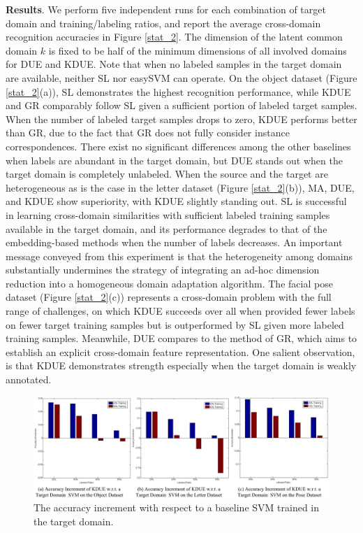 \documentclass[10pt,twocolumn,letterpaper]{article}
\begin{document}
\noindent\textbf{Results}. We perform five independent runs for each combination of target domain and training/labeling ratios, and report the average cross-domain recognition accuracies in Figure \ref{stat_2}. The dimension of the latent common domain $k$ is fixed to be half of the minimum dimensions of all involved domains for DUE and KDUE. Note that when no labeled samples in the target domain are available, neither SL nor easySVM can operate. On the object dataset (Figure \ref{stat_2}(a)), SL demonstrates the highest recognition performance, while KDUE and GR comparably follow SL given a sufficient portion of labeled target samples. When the number of labeled target samples drops to zero, KDUE performs better than GR, due to the fact that GR does not fully consider instance correspondences. There exist no significant differences among the other baselines when labels are abundant in the target domain, but DUE stands out when the target domain is completely unlabeled. When the source and the target are heterogeneous as is the case in the letter dataset (Figure \ref{stat_2}(b)), MA, DUE, and KDUE show superiority, with KDUE slightly standing out. SL is successful in learning cross-domain similarities with sufficient labeled training samples available in the target domain, and its performance degrades to that of the embedding-based methods when the number of labels decreases. An important message conveyed from this experiment is that the heterogeneity among domains substantially undermines the strategy of integrating an ad-hoc dimension reduction into a homogeneous domain adaptation algorithm. The facial pose dataset (Figure \ref{stat_2}(c)) represents a cross-domain problem with the full range of challenges, on which KDUE succeeds over all when provided fewer labels on fewer target training samples but is outperformed by SL given more labeled training samples. Meanwhile, DUE compares to the method of GR, which aims to establish an explicit cross-domain feature representation. One salient observation, is that KDUE demonstrates strength especially when the target domain is weakly annotated.


\begin{figure}[t]
\begin{center}
\includegraphics[scale=1.6]{stat_new_1.png}
\end{center}
\caption{The accuracy increment with respect to a baseline SVM trained in the target domain.}
\label{stat_1}
\end{figure}
\end{document}
